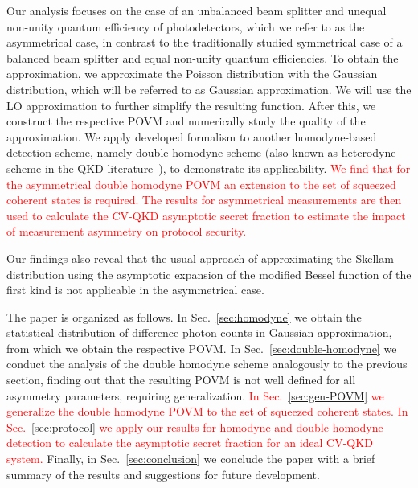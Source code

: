 \documentclass[%
reprint,
superscriptaddress,
 amsmath,amssymb,amsfonts,
 aps,
 pra,
 longbibliography
]{revtex4-2}
\begin{document}
Our analysis focuses on the case of an unbalanced beam splitter and unequal non-unity quantum
efficiency of photodetectors, which we refer to as the asymmetrical case, in contrast to the
traditionally studied symmetrical case of a balanced beam splitter and equal non-unity quantum
efficiencies. To obtain the approximation, we approximate the Poisson distribution with the Gaussian
distribution, which will be referred to as Gaussian approximation. We will use the LO approximation
to further simplify the resulting function. After this, we construct the respective POVM and
numerically study the quality of the approximation. We apply developed formalism to another
homodyne-based detection scheme, namely double homodyne scheme (also known as heterodyne scheme in
the QKD literature~\cite{Pirandola:20,opt3040030,Zhang:apr:2024}), to demonstrate its applicability. \textcolor{red}{We find that for the asymmetrical double homodyne POVM an extension to the set of squeezed coherent states is required. The results for asymmetrical measurements are then used to calculate the CV-QKD asymptotic secret fraction to estimate the impact of measurement asymmetry on protocol security.}

Our findings also reveal that the usual approach of approximating the Skellam distribution using the
asymptotic expansion of the modified Bessel function of the first kind is not applicable in the
asymmetrical case.

The paper is organized as follows.  In Sec.~\ref{sec:homodyne} we obtain the statistical
distribution of difference photon counts in Gaussian approximation, from which we obtain the
respective POVM. %
In Sec.~\ref{sec:double-homodyne} we conduct the analysis of the double homodyne scheme
analogously to the previous section, finding out that the resulting POVM is not well defined for all asymmetry parameters, requiring generalization.
\textcolor{red}{
In Sec.~\ref{sec:gen-POVM} we generalize the double homodyne POVM to the set of squeezed coherent states. 
In Sec.~\ref{sec:protocol} we apply our results for homodyne and double homodyne detection to calculate the asymptotic secret fraction for an ideal CV-QKD system. }
Finally, in Sec.~\ref{sec:conclusion} we conclude the paper with a brief summary of the results and
suggestions for future development.
\end{document}
